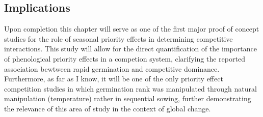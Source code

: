 \documentclass{article}\usepackage[]{graphicx}\usepackage[]{color}
\begin{document}
\subsection*{Implications}
\indent\indent Upon completion this chapter will serve as one of the first major proof of concept studies for the role of seasonal priority effects in determining competitive interactions. This study will allow for the direct quantification of the importance of phenological priority effects in a competion system, clarifying the reported association bewtween rapid germination and competitive dominance. Furthermore, as far as I know, it will be one of the only priority effect competition studies in which germination rank was manipulated through natural manipulation (temperature) rather in sequential sowing, further demonstrating the relevance of this area of study in the context of global change.
\end{document}
